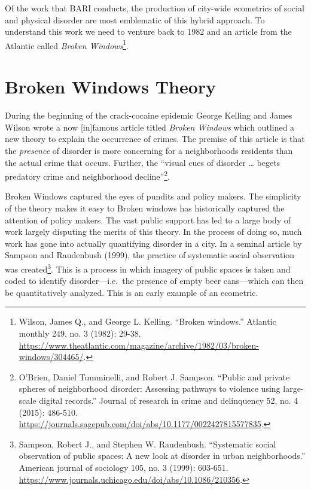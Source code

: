 \documentclass[
]{book}
\begin{document}
Of the work that BARI conducts, the production of city-wide ecometrics of social and physical disorder are most emblematic of this hybrid approach. To understand this work we need to venture back to 1982 and an article from the Atlantic called \emph{Broken Windows}\footnote{Wilson, James Q., and George L. Kelling. ``Broken windows.'' Atlantic monthly 249, no. 3 (1982): 29-38. \url{https://www.theatlantic.com/magazine/archive/1982/03/broken-windows/304465/}.}.

\hypertarget{broken-windows-theory}{%
\section{Broken Windows Theory}\label{broken-windows-theory}}

During the beginning of the crack-cocaine epidemic George Kelling and James Wilson wrote a now {[}in{]}famous article titled \emph{Broken Windows} which outlined a new theory to explain the occurrence of crimes. The premise of this article is that the \emph{presence} of disorder is more concerning for a neighborhoods residents than the actual crime that occurs. Further, the ``visual cues of disorder \ldots{} begets predatory crime and neighborhood decline''\footnote{O'Brien, Daniel Tumminelli, and Robert J. Sampson. ``Public and private spheres of neighborhood disorder: Assessing pathways to violence using large-scale digital records.'' Journal of research in crime and delinquency 52, no. 4 (2015): 486-510. \url{https://journals.sagepub.com/doi/abs/10.1177/0022427815577835}.}.

Broken Windows captured the eyes of pundits and policy makers. The simplicity of the theory makes it easy to Broken windows has historically captured the attention of policy makers. The vast public support has led to a large body of work largely disputing the merits of this theory. In the process of doing so, much work has gone into actually quantifying disorder in a city. In a seminal article by Sampson and Raudenbush (1999), the practice of systematic social observation was created\footnote{Sampson, Robert J., and Stephen W. Raudenbush. ``Systematic social observation of public spaces: A new look at disorder in urban neighborhoods.'' American journal of sociology 105, no. 3 (1999): 603-651. \url{https://www.journals.uchicago.edu/doi/abs/10.1086/210356}.}. This is a process in which imagery of public spaces is taken and coded to identify disorder---i.e.~the presence of empty beer cans---which can then be quantitatively analyzed. This is an early example of an ecometric.
\end{document}
